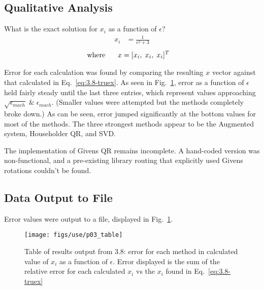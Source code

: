 \documentclass[paper=a4, fontsize=11pt]{scrartcl}
\numberwithin{equation}{section}		%
\numberwithin{figure}{section}			%
\numberwithin{table}{section}				%
\begin{document}
\subsection{Qualitative Analysis}
What is the exact solution for $x_i$ as a function of $\epsilon$?
\begin{align}
	x_i &= \frac{1}{e^2 + 3}  \label{eq:3.8-truex}
\end{align}
\begin{align*}
	\textnormal{where \hspace{5mm}} x &= [x_i, \; x_i, \; x_i]^T	
\end{align*} \vspace{-3mm}
\par Error for each calculation was found by comparing the resulting $x$ vector against that calculated in Eq.~\ref{eq:3.8-truex}. As seen in Fig.~\ref{fig:3.8}, error as a function of $\epsilon$ held fairly steady until the last three entries, which represent values approaching $\sqrt{\epsilon_{mach}} \; \& \; \epsilon_{mach}$. (Smaller values were attempted but the methods completely broke down.) As can be seen, error jumped significantly at the bottom values for most of the methods. The three strongest methods appear to be the Augmented system, Householder QR, and SVD. \\ 
\par The implementation of Givens QR remains incomplete. A hand-coded version was non-functional, and a pre-existing library routing that explicitly used Givens rotations couldn't be found. \\

\vspace{4mm}
\subsection{Data Output to File}
Error values were output to a file, displayed in Fig.~\ref{fig:3.8}.
\begin{center}
	\begin{figure}[!htb]
		\texttt{[image: figs/use/p03\_table]}
		\caption{Table of results output from 3.8: error for each method in calculated value of $x_i$ as a function of $\epsilon$. Error displayed is the sum of the relative error for each calculated $x_i$ vs the $x_i$ found in Eq.~\ref{eq:3.8-truex} }
		\label{fig:3.8}
	\end{figure}
\end{center}

\vspace{4mm}
\end{document}
